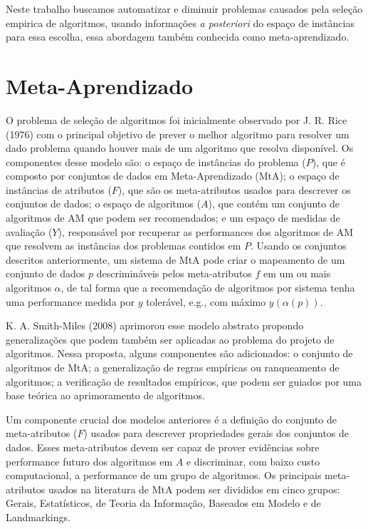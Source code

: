 Neste trabalho buscamos automatizar e diminuir problemas causados pela seleção
empirica de algoritmos, usando informações \textit{a posteriori} do espaço de
instâncias para essa escolha, essa abordagem também conhecida como
meta-aprendizado.

\section{Meta-Aprendizado}
\label{sec:metalearning}
O problema de seleção de algoritmos foi inicialmente observado por J. R. Rice
(1976) \cite{Rice1976} com o principal objetivo de prever o melhor algoritmo
para resolver um dado problema quando houver mais de um algoritmo que resolva
disponível.
Os componentes desse modelo são: o espaço de instâncias do problema ($P$), que
é composto por conjuntos de dados em Meta-Aprendizado (MtA); o espaço de
instâncias de atributos ($F$), que são os meta-atributos usados para descrever
os conjuntos de dados; o espaço de algoritmos ($A$), que contém um conjunto de
algoritmos de AM que podem ser recomendados; e um espaço de medidas de
avaliação ($Y$), responsável por recuperar as performances dos algoritmos de AM
que resolvem as instâncias dos problemas contidos em $P$.
Usando os conjuntos descritos anteriormente, um sistema de MtA pode criar o
mapeamento de um conjunto de dados $p$ descrimináveis pelos meta-atributos $f$
em um ou mais algoritmos $\alpha$, de tal forma que a recomendação de
algoritmos por sistema tenha uma performance medida por $y$ tolerável, e.g.,
com máximo $y(\alpha(p))$.

K. A. Smith-Miles (2008) \cite{SmithMiles2008} aprimorou esse modelo abstrato
propondo generalizações que podem também ser aplicadas ao problema do projeto
de algoritmos.  Nessa proposta, alguns componentes são adicionados: o conjunto
de algoritmos de MtA; a generalização de regras empíricas ou ranqueamento de
algoritmos; a verificação de resultados empíricos, que podem ser guiados por
uma base teórica ao aprimoramento de algoritmos.

Um componente crucial dos modelos anteriores é a definição do conjunto de
meta-atributos ($F$) usados para descrever propriedades gerais dos conjuntos de
dados. Esses meta-atributos devem ser capaz de prover evidências sobre
performance futuro dos algoritmos em $A$ \cite{Soares2001, Reif2012} e
discriminar, com baixo custo computacional, a performance de um grupo de
algoritmos. Os principais meta-atributos usados na literatura de MtA podem ser
divididos em cinco grupos: Gerais, Estatísticos, de Teoria da Informação,
Baseados em Modelo e de Landmarkings.

